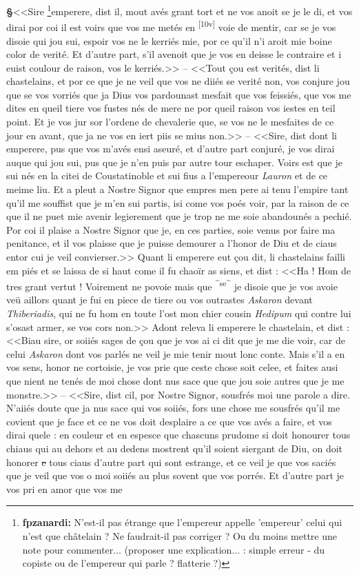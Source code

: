 \documentclass[12pt]{article} %
\newcommand{\foliomar}[2]{\marginnote{\href{#2}{[#1]}}}
\newcommand{\foliomarID}[1]{\textsuperscript{[#1]}} %
\newcommand{\persName}[1]{\emph{#1}} %
\newcommand{\placeName}[1]{\emph{#1}} %
\newcommand{\add}[1]{\textsuperscript{#1}}       %
\newcommand{\fnfpz}[1]{\footnote{\textbf{fpzanardi:} #1}} %
\newcommand{\del}[1]{\sout{#1}}      %
\newcounter{paranum}
\newcommand{\pnum}{\stepcounter{paranum}\textbf{§\arabic{paranum}}\quad}
\begin{document}
\pnum <<Sire \fnfpz{N'est-il pas étrange que l'empereur appelle 'empereur' celui qui n'est que châtelain ? Ne faudrait-il pas corriger ? Ou du moins mettre une note pour commenter... (proposer une explication... : simple erreur - du copiste ou de l'empereur qui parle ? flatterie ?)}emperere, dist il, mout avés grant tort et ne vos anoit se je le di, et vos dirai por coi il est voirs que vos me metés en \foliomar{10va}{https://gallica.bnf.fr/ark:/12148/btv1b10023851v/f26.image} \foliomarID{10v} voie de mentir, car se je vos disoie qui jou sui, espoir vos ne le kerriés mie, por ce qu'il n'i aroit mie boine color de verité. Et d'autre part, s'il avenoit que je vos en deisse le contraire et i euist coulour de raison, vos le kerriés.>> -- <<Tout çou est verités, dist li chastelains, et por ce que je ne veil que vos ne diiés se verité non, vos conjure jou que se vos vorriés que ja Dius vos pardounast mesfait que vos feissiés, que vos me dites en queil tiere vos fustes nés de mere ne por queil raison vos iestes en teil point. Et je vos jur sor l'ordene de chevalerie que, se vos ne le mesfaites de ce jour en avant, que ja ne vos en iert piis se mius non.>> -- <<Sire, dist dont li emperere, pus que vos m'avés ensi aseuré, et d'autre part conjuré, je vos dirai auque qui jou sui, pus que je n'en puis par autre tour eschaper. Voirs est que je sui nés en la citei de Coustatinoble et sui fius a l'empereour \persName{Lauron} et de ce meime liu. Et a pleut a Nostre Signor que empres men pere ai tenu l'empire tant qu'il me souffist que je m'en sui partis, isi come vos poés voir, par la raison de ce que il ne puet mie avenir legierement que je trop ne me soie abandounés a pechié. Por coi il plaise a Nostre Signor que je, en ces parties, soie venus por faire ma penitance, et il vos plaisse que je puisse demourer a l'honor de Diu et de ciaus entor cui je veil convierser.>> Quant li emperere eut çou dit, li chastelains failli em piés et se laissa de si haut come il fu chaoïr as siens, et dist : <<Ha ! Hom de tres grant vertut ! Voirement ne povoie mais que \add{^se^} je disoie que je vos avoie veü aillors quant je fui en piece de tiere ou vos outrastes \persName{Askaron} devant \placeName{Thiberiadis}, qui ne fu hom en toute l'ost mon chier cousin \persName{Hedipum} qui contre lui s'osast armer, se vos cors non.>> Adont releva li emperere le chastelain, et dist : <<Biau sire, or soiiés sages de çou que je vos ai ci dit que je me die voir, car de celui \persName{Askaron} dont vos parlés ne veil je mie tenir mout lonc conte. Mais s'il a en vos sens, honor ne cortoisie, je vos prie que ceste chose soit celee, et faites ausi que nient ne tenés de moi chose dont nus sace que que jou soie autres que je me monstre.>> -- <<Sire, dist cil, por Nostre Signor, sousfrés moi une parole a dire. N'aiiés doute que ja nus sace qui vos soiiés, fors une chose me sousfrés qu'il me covient que je face et ce ne vos doit desplaire a ce que vos avés a faire, et vos dirai quele : en couleur et en espesce que chascuns prudome si doit honourer tous chiaus qui au dehors et au dedens mostrent qu'il soient siergant de Diu, on doit honorer \del{e} tous ciaus d'autre part qui sont estrange, et ce veil je que vos saciés que je veil que vos o moi soiiés au plus sovent que vos porrés. Et d'autre part je vos pri en amor que vos me 
\end{document}
